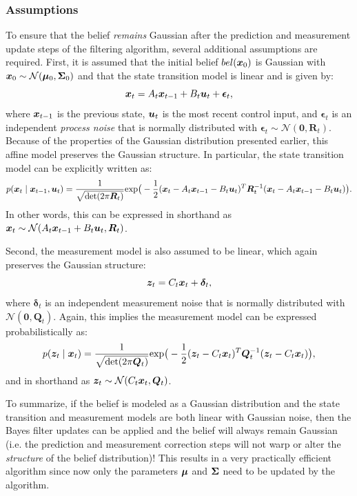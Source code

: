 \subsubsection{Assumptions}
To ensure that the belief \textit{remains} Gaussian after the prediction and measurement update steps of the filtering algorithm, several additional assumptions are required.
First, it is assumed that the initial belief $bel(\bm{x}_0)$ is Gaussian with $\bm{x}_0 \sim \mathcal{N}(\bm{\mu}_0, \bm{\Sigma}_0)$ and that the state transition model is linear and is given by:
\begin{equation} \label{eq:KFdynamics}
    \bm{x}_t = A_t \bm{x}_{t-1} + B_t \bm{u}_t + \bm{\epsilon}_t,
\end{equation}
where $\bm{x}_{t-1}$ is the previous state, $\bm{u}_t$ is the most recent control input, and $\bm{\epsilon}_{t}$ is an independent \textit{process noise} that is normally distributed with $\bm{\epsilon}_t \sim \mathcal{N}(\bm{0},\bm{R}_t)$.
Because of the properties of the Gaussian distribution presented earlier, this affine model preserves the Gaussian structure. In particular, the state transition model can be explicitly written as:
\begin{equation*}
p(\bm{x}_t \mid \bm{x}_{t-1}, \bm{u}_t) = \frac{1}{\sqrt{\text{det}(2\pi \bm{R}_t)}} \text{exp}\big( -\frac{1}{2}(\bm{x}_t-A_t \bm{x}_{t-1} - B_t \bm{u}_t)^T \bm{R}_t^{-1} (\bm{x}_t-A_t \bm{x}_{t-1} - B_t \bm{u}_t) \big).
\end{equation*}
In other words, this can be expressed in shorthand as $\bm{x}_t \sim \mathcal{N}(A_t \bm{x}_{t-1} + B_t \bm{u}_t, \bm{R}_t)$.

Second, the measurement model is also assumed to be linear, which again preserves the Gaussian structure:
\begin{equation} \label{eq:measure}
\bm{z}_t = C_t \bm{x}_t + \bm{\delta}_t,
\end{equation}
where $\bm{\delta}_t$ is an independent measurement noise that is normally distributed with $\mathcal{N}(\bm{0},\bm{Q}_t)$.
Again, this implies the measurement model can be expressed probabilistically as:
\begin{equation*}
p(\bm{z}_t \mid \bm{x}_t) = \frac{1}{\sqrt{\text{det}(2\pi \bm{Q}_t)}} \text{exp}\big( -\frac{1}{2}(\bm{z}_t-C_t\bm{x}_t)^T \bm{Q}_t^{-1} (\bm{z}_t-C_t\bm{x}_t) \big),
\end{equation*}
and in shorthand as $\bm{z}_t \sim \mathcal{N}(C_t \bm{x}_{t}, \bm{Q}_t)$.

To summarize, if the belief is modeled as a Gaussian distribution and the state transition and measurement models are both linear with Gaussian noise, then the Bayes filter updates can be applied and the belief will always remain Gaussian (i.e. the prediction and measurement correction steps will not warp or alter the \textit{structure} of the belief distribution)! This results in a very practically efficient algorithm since now only the parameters $\bm{\mu}$ and $\bm{\Sigma}$ need to be updated by the algorithm.


